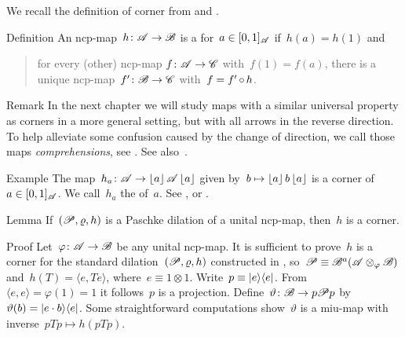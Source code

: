 \begin{parsec}%
\begin{point}%
We recall the definition of corner
        from \cite[Dfn.~2]{westerbaan2016universal} and .
\end{point}
\begin{point}{Definition}%
An ncp-map~$h \colon \mathscr{A} \to \mathscr{B}$
is a  for~$a \in [0,1]_{\mathscr{A}}$ if~$h(a)=h(1)$
    and
    \begin{quote}
        for every (other) ncp-map $f\colon \mathscr{A} \to \mathscr{C}$
            with~$f(1)=f(a)$,
            there is a unique ncp-map~$f'\colon \mathscr{B} \to \mathscr{C}$
            with~$f = f' \mathop{\circ} h$.
    \end{quote}
\begin{point}{Remark}%
In the next chapter we will study maps with a similar universal property
    as corners in a more general setting,
    but with all arrows in the reverse direction.
To help alleviate some confusion caused by the change of direction,
    we call those maps \emph{comprehensions},
    see .  See also~\cite{effintro}.
\end{point}
\end{point}
\begin{point}{Example}%
    The map~$h_a \colon \mathscr{A} \to \left\lfloor a\right\rfloor \mathscr{A} \left\lfloor a\right\rfloor$ given
    by~$b \mapsto \left\lfloor a\right\rfloor b \left\lfloor a\right\rfloor$
    is a corner of~$a \in [0,1]_{\mathscr{A}}$.
    We call~$h_a$ the  of~$a$.
    See , 
        or \cite[Prop.~5]{westerbaan2016universal}.
\end{point}
\begin{point}{Lemma}%
If~$(\mathscr{P}, \varrho, h)$ is a Paschke dilation of a unital ncp-map,
    then~$h$ is a corner.
\begin{point}{Proof}%
Let~$\varphi \colon \mathscr{A} \to \mathscr{B}$ be any unital ncp-map.
It is sufficient to prove~$h$
    is a corner for the
    standard dilation~$(\mathscr{P} , \varrho, h)$
    constructed in ,
    so~$\mathscr{P} \equiv \mathscr{B}^a(\mathscr{A} \otimes_\varphi \mathscr{B})$
    and~$h(T) = \langle e, T e\rangle$, where~$e \equiv 1\otimes 1$.
    Write~$p \equiv \left|e\right>\!\left<e\right|$.
From~$\langle e,e\rangle = \varphi(1) = 1$
    it follows~$p$ is a projection.
Define~$\vartheta\colon \mathscr{B} \to p \mathscr{P} p$
    by~$\vartheta(b) = \left|e \cdot b\right>\!\left<e\right|$.
Some straightforward computations
    show~$\vartheta$ is a miu-map
    with inverse~$pTp \mapsto h(pTp)$.

\end{point}
\end{point}
\end{parsec}
